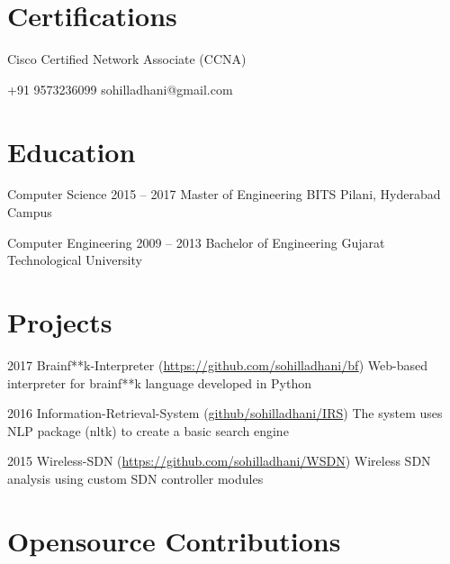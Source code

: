 \documentclass[fontsize=10pt]{tccv}
\begin{document}
\section{Certifications}
Cisco Certified Network Associate (CCNA)


    {+91 9573236099}
    {sohilladhani@gmail.com}

\section{Education}

\begin{yearlist}

\item[Computer Science]{2015 -- 2017}
     {Master of Engineering}
     {BITS Pilani, Hyderabad Campus}

\item[Computer Engineering]{2009 -- 2013}
     {Bachelor of Engineering}
     {Gujarat Technological University}

\end{yearlist}

\section{Projects}

\begin{yearlist}

\item{2017}
     {Brainf**k-Interpreter (\href{https://github.com/sohilladhani/brainfuck-interpreter}{https://github.com/sohilladhani/bf})}
     {Web-based interpreter for brainf**k language developed in Python}

\item{2016}
     {Information-Retrieval-System (\href{https://github.com/sohilladhani/Information-Retrieval-System}{github/sohilladhani/IRS})}
        {The system uses NLP package (nltk) to create a basic search engine}
	

\item{2015}
     {Wireless-SDN (\href{https://github.com/sohilladhani/Wireless-SDN/}{https://github.com/sohilladhani/WSDN})}
     {Wireless SDN analysis using custom SDN controller modules}

\end{yearlist}

\section{Opensource Contributions}
\end{document}
